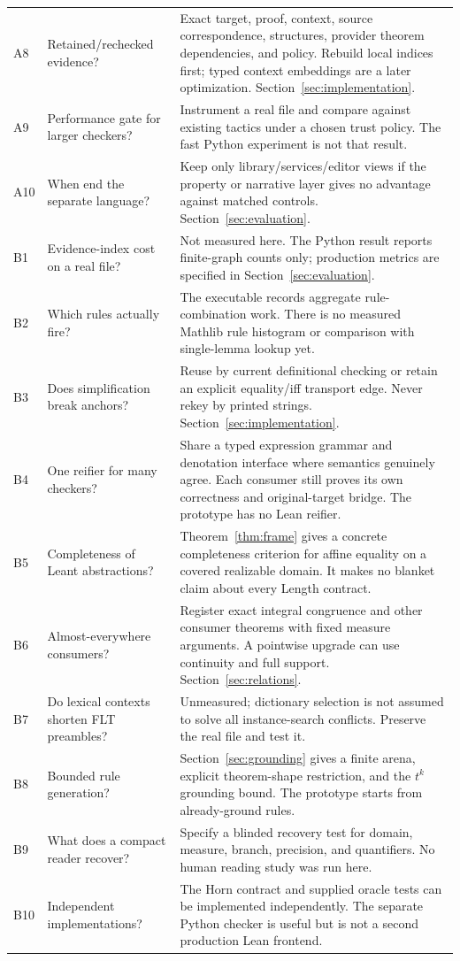 \documentclass[11pt,a4paper]{article}
\theoremstyle{plain}
\theoremstyle{definition}
\theoremstyle{remark}
\begin{document}
\begin{longtable}{@{}P{.08\textwidth}P{.30\textwidth}P{.55\textwidth}@{}}
A8 & Retained/rechecked evidence? & Exact target, proof, context, source correspondence, structures, provider theorem dependencies, and policy. Rebuild local indices first; typed context embeddings are a later optimization. Section~\ref{sec:implementation}.\\
A9 & Performance gate for larger checkers? & Instrument a real file and compare against existing tactics under a chosen trust policy. The fast Python experiment is not that result.\\
A10 & When end the separate language? & Keep only library/services/editor views if the property or narrative layer gives no advantage against matched controls. Section~\ref{sec:evaluation}.\\\midrule
B1 & Evidence-index cost on a real file? & Not measured here. The Python result reports finite-graph counts only; production metrics are specified in Section~\ref{sec:evaluation}.\\
B2 & Which rules actually fire? & The executable records aggregate rule-combination work. There is no measured Mathlib rule histogram or comparison with single-lemma lookup yet.\\
B3 & Does simplification break anchors? & Reuse by current definitional checking or retain an explicit equality/iff transport edge. Never rekey by printed strings. Section~\ref{sec:implementation}.\\
B4 & One reifier for many checkers? & Share a typed expression grammar and denotation interface where semantics genuinely agree. Each consumer still proves its own correctness and original-target bridge. The prototype has no Lean reifier.\\
B5 & Completeness of Leant abstractions? & Theorem~\ref{thm:frame} gives a concrete completeness criterion for affine equality on a covered realizable domain. It makes no blanket claim about every Length contract.\\
B6 & Almost-everywhere consumers? & Register exact integral congruence and other consumer theorems with fixed measure arguments. A pointwise upgrade can use continuity and full support. Section~\ref{sec:relations}.\\
B7 & Do lexical contexts shorten FLT preambles? & Unmeasured; dictionary selection is not assumed to solve all instance-search conflicts. Preserve the real file and test it.\\
B8 & Bounded rule generation? & Section~\ref{sec:grounding} gives a finite arena, explicit theorem-shape restriction, and the $t^k$ grounding bound. The prototype starts from already-ground rules.\\
B9 & What does a compact reader recover? & Specify a blinded recovery test for domain, measure, branch, precision, and quantifiers. No human reading study was run here.\\
B10 & Independent implementations? & The Horn contract and supplied oracle tests can be implemented independently. The separate Python checker is useful but is not a second production Lean frontend.\\
\end{longtable}
\endgroup
\end{document}
